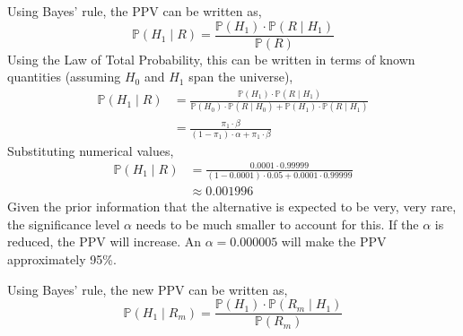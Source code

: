 \documentclass[12pt,twoside]{article}
\begin{document}
\begin{problems}
\newpage

\problem  %

\begin{problemparts}

\problempart  %

Using Bayes' rule, the PPV can be written as,
$$ \mathbb{P}(H_1 \mid R) = \frac{\mathbb{P}(H_1) \cdot \mathbb{P}(R \mid
H_1)}{\mathbb{P}(R)} $$
Using the Law of Total Probability, this can be written in terms of known
quantities (assuming $H_0$ and $H_1$ span the universe),
\begin{align*}
    \mathbb{P}(H_1 \mid R) &= \frac{\mathbb{P}(H_1) \cdot \mathbb{P}(R \mid
    H_1)}{\mathbb{P}(H_0) \cdot \mathbb{P}(R \mid H_0) + \mathbb{P}(H_1)
    \cdot \mathbb{P}(R \mid H_1)} \\
    &= \boxed{\frac{\pi_1 \cdot \beta}{(1 - \pi_1) \cdot \alpha + \pi_1 \cdot
    \beta}}
\end{align*}
Substituting numerical values,
\begin{align*}
    \mathbb{P}(H_1 \mid R) &= \frac{0.0001 \cdot 0.99999}{(1 - 0.0001) \cdot
    0.05 + 0.0001 \cdot 0.99999} \\
    &\approx \boxed{0.001996}
\end{align*}
Given the prior information that the alternative is expected to be very, very
rare, the significance level $\alpha$ needs to be much smaller to account for
this. If the $\alpha$ is reduced, the PPV will increase. An $\alpha =
0.000005$ will make the PPV approximately 95\%.

\problempart  %

Using Bayes' rule, the new PPV can be written as,
$$ \mathbb{P}(H_1 \mid R_m) = \frac{\mathbb{P}(H_1) \cdot \mathbb{P}(R_m \mid
H_1)}{\mathbb{P}(R_m)} $$

\problempart  %

\end{problemparts}

\newpage

\problem  %


\end{problems}
\end{document}
